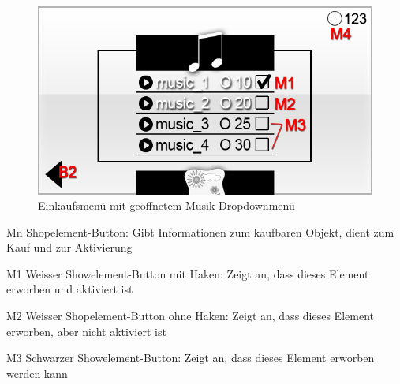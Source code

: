 \begin{figure}[H]
\centering
\includegraphics[scale=0.55]{../gui/_jpeg_numeration/shop_popup.jpg}
\caption{Einkaufsmenü mit geöffnetem Musik-Dropdownmenü}
\label{fig:Einkaufsmenu_Dropdown}
\end{figure}
\begin{description*}
\item[Mn] Shopelement-Button: Gibt Informationen zum kaufbaren Objekt, dient zum Kauf und zur Aktivierung
\item[M1] Weisser Showelement-Button mit Haken: Zeigt an, dass dieses Element erworben und aktiviert ist
\item[M2] Weisser Shopelement-Button ohne Haken: Zeigt an, dass dieses Element erworben, aber nicht aktiviert ist
\item[M3] Schwarzer Showelement-Button: Zeigt an, dass dieses Element erworben werden kann
\end{description*}
